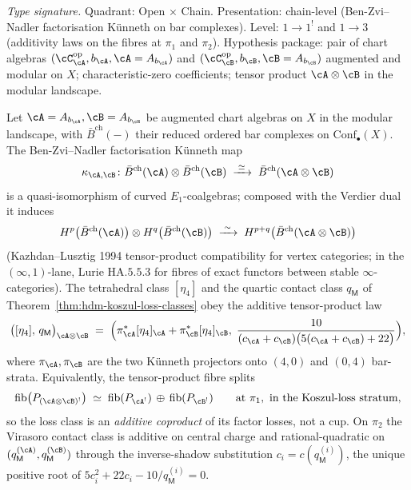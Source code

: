 \begin{lemma}
\label{lem:hdm-koszul-loss-kunneth}
\emph{Type signature.} Quadrant: Open $\times$ Chain. Presentation:
chain-level (Ben-Zvi--Nadler factorisation K\"unneth on bar
complexes). Level: $1\!\to\!1^!$ and $1\!\to\!3$ (additivity laws on
the fibres at $\pi_1$ and $\pi_2$). Hypothesis package: pair of
chart algebras $(\cC^{\mathrm{op}}_\cA, b_\cA, \cA = A_{b_\cA})$ and
$(\cC^{\mathrm{op}}_\cB, b_\cB, \cB = A_{b_\cB})$ augmented and
modular on $X$; characteristic-zero coefficients; tensor product
$\cA\otimes\cB$ in the modular landscape.

Let $\cA = A_{b_\cA}, \cB = A_{b_\cB}$ be augmented chart algebras
on $X$ in the modular landscape, with $\bar B^{\mathrm{ch}}(-)$
their reduced ordered bar complexes on $\mathrm{Conf}_\bullet(X)$.
The Ben-Zvi--Nadler
factorisation K\"unneth map
\[
\kappa_{\cA,\cB}\colon
\bar B^{\mathrm{ch}}(\cA)\otimes \bar B^{\mathrm{ch}}(\cB)
\;\xrightarrow{\;\simeq\;}\;
\bar B^{\mathrm{ch}}(\cA\otimes\cB)
\]
is a quasi-isomorphism of curved $E_1$-coalgebras; composed with the
Verdier dual it induces
\[
H^p\bigl(\bar B^{\mathrm{ch}}(\cA)\bigr)
\otimes
H^q\bigl(\bar B^{\mathrm{ch}}(\cB)\bigr)
\;\xrightarrow{\;\sim\;}\;
H^{p+q}\bigl(\bar B^{\mathrm{ch}}(\cA\otimes\cB)\bigr)
\]
(Kazhdan--Lusztig \textup{1994} tensor-product compatibility for
vertex categories; in the $(\infty,1)$-lane, Lurie
$\mathrm{HA}.5.5.3$ for fibres of exact functors between stable
$\infty$-categories). The tetrahedral class $[\eta_4]$ and the
quartic contact class $q_\mathsf{M}$ of
Theorem~\ref{thm:hdm-koszul-loss-classes} obey the additive
tensor-product law
\[
\bigl([\eta_4],\,q_\mathsf{M}\bigr)_{\cA\otimes\cB}
\;=\;
\Bigl(
\pi_\cA^\ast[\eta_4]_\cA
+\pi_\cB^\ast[\eta_4]_\cB
,\;
\frac{10}{(c_\cA+c_\cB)\bigl(5(c_\cA+c_\cB)+22\bigr)}
\Bigr),
\]
where $\pi_\cA,\pi_\cB$ are the two K\"unneth projectors onto
$(4,0)$ and $(0,4)$ bar-strata. Equivalently, the tensor-product
fibre splits
\[
\mathrm{fib}\bigl(P_{(\cA\otimes\cB)^!}\bigr)
\;\simeq\;
\mathrm{fib}(P_{\cA^!})\,\oplus\,\mathrm{fib}(P_{\cB^!})
\qquad\text{at }\pi_1,\ \text{in the Koszul-loss stratum,}
\]
so the loss class is an \emph{additive coproduct} of its factor
losses, not a cup. On $\pi_2$ the Virasoro contact class is
additive on central charge and rational-quadratic on
$(q_\mathsf{M}^{(\cA)},q_\mathsf{M}^{(\cB)})$ through the
inverse-shadow substitution $c_i = c(q_\mathsf{M}^{(i)})$, the
unique positive root of $5c_i^2+22c_i - 10/q_\mathsf{M}^{(i)}=0$.
\end{lemma}

